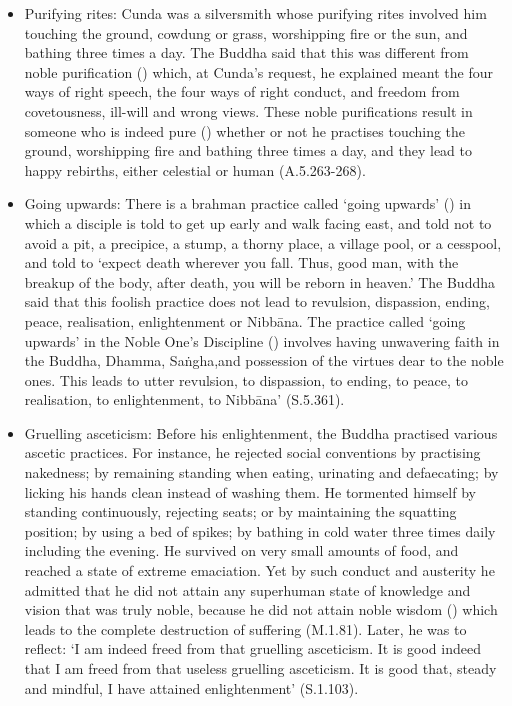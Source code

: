 \begin{itemize}
\item Purifying rites: Cunda was a silversmith whose purifying rites involved him touching the ground, cowdung or grass, worshipping fire or the sun, and bathing three times a day. The Buddha said that this was different from noble purification () which, at Cunda's request, he explained meant the four ways of right speech, the four ways of right conduct, and freedom from covetousness, ill-will and wrong views. These noble purifications result in someone who is indeed pure () whether or not he practises touching the ground, worshipping fire and bathing three times a day, and they lead to happy rebirths, either celestial or human (A.5.263-268).
\item Going upwards: There is a brahman practice called `going upwards' () in which a disciple is told to get up early and walk facing east, and told not to avoid a pit, a precipice, a stump, a thorny place, a village pool, or a cesspool, and told to `expect death wherever you fall. Thus, good man, with the breakup of the body, after death, you will be reborn in heaven.' The Buddha said that this foolish practice does not lead to revulsion, dispassion, ending, peace, realisation, enlightenment or Nibbāna. The practice called `going upwards' in the Noble One's Discipline () involves having unwavering faith in the Buddha, Dhamma, Sa\.ngha,and possession of the virtues dear to the noble ones. This leads to utter revulsion, to dispassion, to ending, to peace, to realisation, to enlightenment, to Nibbāna' (S.5.361).
\item Gruelling asceticism: Before his enlightenment, the Buddha practised various ascetic practices. For instance, he rejected social conventions by practising nakedness; by remaining standing when eating, urinating and defaecating; by licking his hands clean instead of washing them. He tormented himself by standing continuously, rejecting seats; or by maintaining the squatting position; by using a bed of spikes; by bathing in cold water three times daily including the evening. He survived on very small amounts of food, and reached a state of extreme emaciation. Yet by such conduct and austerity he admitted that he did not attain any superhuman state of knowledge and vision that was truly noble, because he did not attain noble wisdom () which leads to the complete destruction of suffering (M.1.81). Later, he was to reflect: `I am indeed freed from that gruelling asceticism. It is good indeed that I am freed from that useless gruelling asceticism. It is good that, steady and mindful, I have attained enlightenment' (S.1.103).
\end{itemize}
